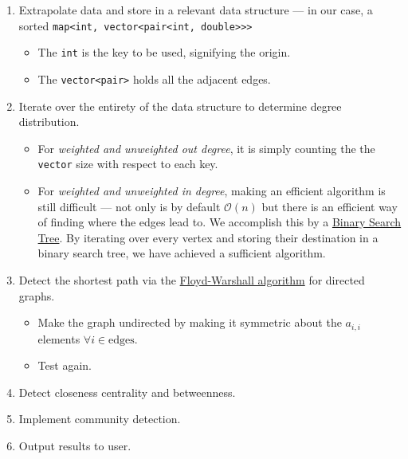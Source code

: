 \documentclass{article}
\begin{document}
\begin{enumerate}
    \item Extrapolate data and store in a relevant data structure --- in our case, a sorted \texttt{map<int, vector<pair<int, double>>>}
    \begin{itemize}
        \item The \texttt{int} is the key to be used, signifying the origin.
        \item The \texttt{vector<pair>} holds all the adjacent edges.
    \end{itemize}
    \item Iterate over the entirety of the data structure to determine degree distribution.
    \begin{itemize}
        \item For \emph{weighted and unweighted out degree}, it is simply counting the the \texttt{vector} size with respect to each key.
        \item For \emph{weighted and unweighted in degree}, making an efficient algorithm is still difficult --- not only is by default $\mathcal{O}(n)$ but there is an efficient way of finding where the edges lead to. We accomplish this by a \href{https://en.wikipedia.org/wiki/Binary_search_tree}{Binary Search Tree}. By iterating over every vertex and storing their destination in a binary search tree, we have achieved a sufficient algorithm.
    \end{itemize}
    \item Detect the shortest path via the \href{https://en.wikipedia.org/wiki/Floyd–Warshall_algorithm}{Floyd-Warshall algorithm} for directed graphs.
        \begin{itemize}
            \item Make the graph undirected by making it symmetric about the $a _{i, i}$ elements $\forall i \in \text{edges}$.
            \item Test again.
        \end{itemize}
    \item Detect closeness centrality and betweenness.
    \item Implement community detection.
    \item Output results to user.
\end{enumerate}
\end{document}

